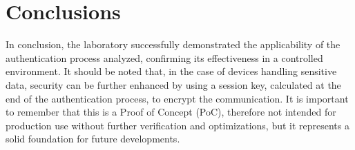 \section{Conclusions}
In conclusion, the laboratory successfully demonstrated the applicability of the authentication process analyzed, confirming its effectiveness in a controlled environment. It should be noted that, in the case of devices handling sensitive data, security can be further enhanced by using a session key, calculated at the end of the authentication process, to encrypt the communication. It is important to remember that this is a Proof of Concept (PoC), therefore not intended for production use without further verification and optimizations, but it represents a solid foundation for future developments.